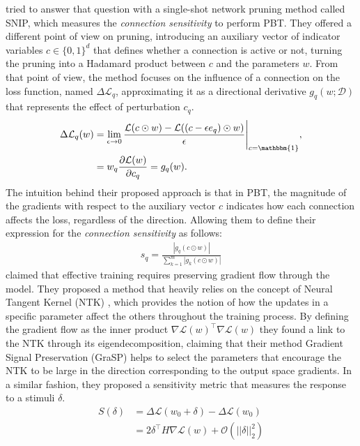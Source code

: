 \citet{lee2018snip} tried to answer that question with a single-shot network pruning method called SNIP, which measures the \textit{connection sensitivity} to perform PBT. They offered a different point of view on pruning, introducing an auxiliary vector of indicator variables $c \in \{0,1\}^d$ that defines whether a connection is active or not, turning the pruning into a Hadamard product between $c$ and the parameters $w$. From that point of view, the method focuses on the influence of a connection on the loss function, named $\Delta \mathcal{L}_q $, approximating it as a directional derivative $g_q(w;\mathcal{D})$ that represents the effect of perturbation $c_q$. 
\begin{align}
    \Delta \mathcal{L}_q(w) 
    &= 
    \lim_{\epsilon \rightarrow 0} \frac{\mathcal{L}(c \odot w) - \mathcal{L}((c - \epsilon e_q) \odot w)}{\epsilon}\Bigg\rvert_{c = \mathbbm{1}},
    \nonumber \\
    &= 
    w_q \frac{\partial \mathcal{L}(w)}{\partial c_q} = g_q(w).
    \label{eq:snip_prev}
\end{align}
The intuition behind their proposed approach is that in PBT, the magnitude of the gradients with respect to the auxiliary vector $c$ indicates how each connection affects the loss, regardless of the direction. Allowing them to define their expression for the \textit{connection sensitivity} as follows:
\begin{align}
    s_q = \frac{|g_q(c \odot w)|}{\sum_{k=1}^{m} |g_k(c \odot w)|}
    \label{eq:snip}
\end{align}
\citet{wang2020picking} claimed that effective training requires preserving gradient flow through the model. They proposed a method that heavily relies on the concept of Neural Tangent Kernel (NTK) \cite{jacot2018neural}, which provides the notion of how the updates in a specific parameter affect the others throughout the training process. By defining the gradient flow as the inner product $\nabla \mathcal{L}(w)^\top \nabla \mathcal{L}(w)$ they found a link to the NTK through its eigendecomposition, claiming that their method Gradient Signal Preservation (GraSP) helps to select the parameters that encourage the NTK to be large in the direction corresponding to the output space gradients. In a similar fashion, they proposed a sensitivity metric that measures the response to a stimuli $\delta$.
\begin{align}
    S(\delta) 
    &= \Delta \mathcal{L}(w_0 + \delta) - \Delta \mathcal{L}(w_0) 
    \nonumber \\
    &= 2\delta^\top H \nabla \mathcal{L}(w) + \mathcal{O}(||\delta||_2^2)
\end{align}
